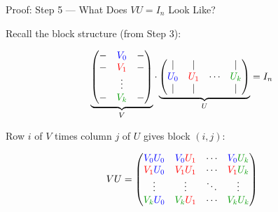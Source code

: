 \documentclass[10pt]{beamer}
\theoremstyle{definition}
\newcommand{\gn}[1]{{\color{green!60!black}#1}}       %
\newcommand{\rd}[1]{{\color{red}#1}}                  %
\newcommand{\bl}[1]{{\color{blue}#1}}                 %
\begin{document}
\begin{frame}{Proof: Step 5 --- What Does $VU = I_n$ Look Like?}

Recall the block structure (from Step 3):

$$\underbrace{\begin{pmatrix}
- & \bl{V_0} & - \\
- & \rd{V_1} & - \\
& \vdots & \\
- & \gn{V_k} & -
\end{pmatrix}}_{V} \cdot \underbrace{\begin{pmatrix}
| & | & & | \\
\bl{U_0} & \rd{U_1} & \cdots & \gn{U_k} \\
| & | & & |
\end{pmatrix}}_{U} = I_n$$

\vspace{0.3em}

Row $i$ of $V$ times column $j$ of $U$ gives block $(i,j)$:

$$VU = \begin{pmatrix}
\bl{V_0}\bl{U_0} & \bl{V_0}\rd{U_1} & \cdots & \bl{V_0}\gn{U_k} \\
\rd{V_1}\bl{U_0} & \rd{V_1}\rd{U_1} & \cdots & \rd{V_1}\gn{U_k} \\
\vdots & \vdots & \ddots & \vdots \\
\gn{V_k}\bl{U_0} & \gn{V_k}\rd{U_1} & \cdots & \gn{V_k}\gn{U_k}
\end{pmatrix}$$

\end{frame}
\end{document}
